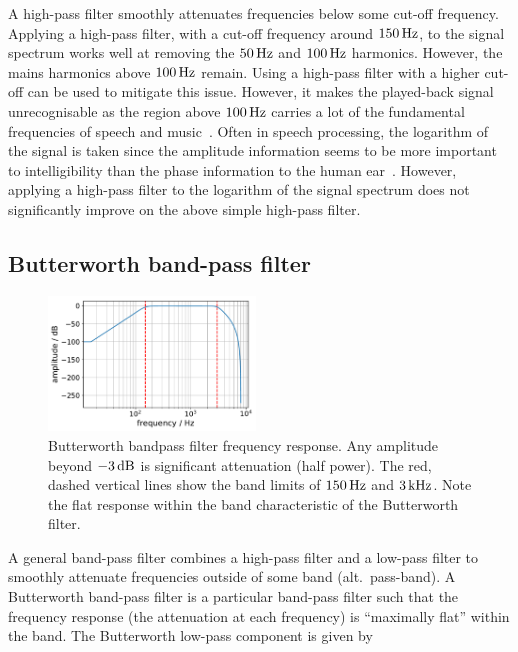 \documentclass[aps,pra,superscriptaddress,reprint,nofootinbib]{revtex4-1}
\begin{document}
A high-pass filter smoothly attenuates frequencies below some cut-off frequency. 
Applying a high-pass filter, with a cut-off frequency around $150\,{\rm Hz}$, to the signal spectrum works well at removing the $50\,{\rm Hz}$ and $100\,{\rm Hz}$ harmonics. However, the mains harmonics above $100\,{\rm Hz}$ remain. Using a high-pass filter with a higher cut-off can be used to mitigate this issue. However, it makes the played-back signal unrecognisable as the region above $100\,{\rm Hz}$ carries a lot of the fundamental frequencies of speech and music~\cite{speech_intelligibility}.
Often in speech processing, the logarithm of the signal is taken since the amplitude information seems to be more important to intelligibility than the phase information to the human ear~\cite{SubjectiveComparison}. However, applying a high-pass filter to the logarithm of the signal spectrum does not significantly improve on the above simple high-pass filter.


\subsection{Butterworth band-pass filter}

\begin{figure}
	\includegraphics[width=0.49\textwidth]{figures/butterworth_150_3000.pdf}
	\caption{Butterworth bandpass filter frequency response. Any amplitude beyond $-3\,{\rm dB}$ is significant attenuation (half power). The red, dashed vertical lines show the band limits of $150\,{\rm Hz}$ and $3\,{\rm kHz}$. Note the flat response within the band characteristic of the Butterworth filter.}
	\label{fig:butterworth}
\end{figure}

A general band-pass filter combines a high-pass filter and a low-pass filter to smoothly attenuate frequencies outside of some band (alt.\ pass-band). A Butterworth band-pass filter is a particular band-pass filter such that the frequency response (the attenuation at each frequency) is ``maximally flat'' within the band. The Butterworth low-pass component is given by %
\end{document}
